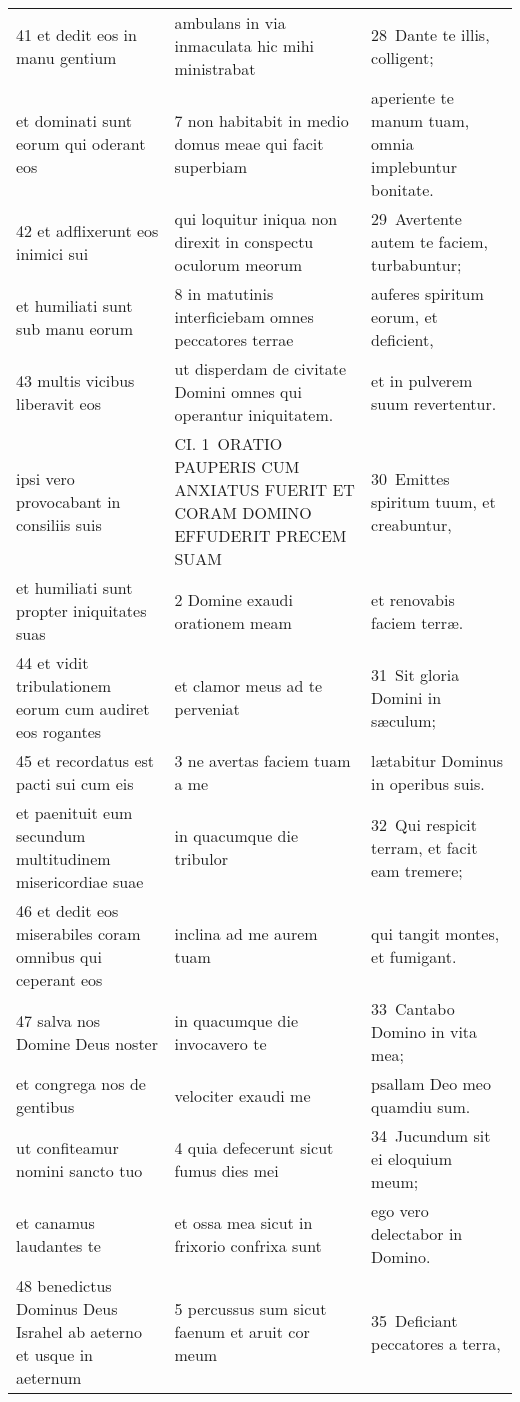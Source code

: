 \documentclass{article}
\begin{document}
\begin{longtable}{@{}p{}p{}p{}@{}}
41 et dedit eos in manu gentium	&	ambulans in via inmaculata hic mihi ministrabat	&	28 Dante te illis, colligent;	\\
et dominati sunt eorum qui oderant eos	&	7 non habitabit in medio domus meae qui facit superbiam	&	aperiente te manum tuam, omnia implebuntur bonitate.	\\
42 et adflixerunt eos inimici sui	&	qui loquitur iniqua non direxit in conspectu oculorum meorum	&	29 Avertente autem te faciem, turbabuntur;	\\
et humiliati sunt sub manu eorum	&	8 in matutinis interficiebam omnes peccatores terrae	&	auferes spiritum eorum, et deficient,	\\
43 multis vicibus liberavit eos	&	ut disperdam de civitate Domini omnes qui operantur iniquitatem.	&	et in pulverem suum revertentur.	\\
ipsi vero provocabant in consiliis suis	&	CI. 1 ORATIO PAUPERIS CUM ANXIATUS FUERIT ET CORAM DOMINO EFFUDERIT PRECEM SUAM	&	30 Emittes spiritum tuum, et creabuntur,	\\
et humiliati sunt propter iniquitates suas	&	2 Domine exaudi orationem meam	&	et renovabis faciem terræ.	\\
44 et vidit tribulationem eorum cum audiret eos rogantes	&	et clamor meus ad te perveniat	&	31 Sit gloria Domini in sæculum;	\\
45 et recordatus est pacti sui cum eis	&	3 ne avertas faciem tuam a me	&	lætabitur Dominus in operibus suis.	\\
et paenituit eum secundum multitudinem misericordiae suae	&	in quacumque die tribulor	&	32 Qui respicit terram, et facit eam tremere;	\\
46 et dedit eos miserabiles coram omnibus qui ceperant eos	&	inclina ad me aurem tuam	&	qui tangit montes, et fumigant.	\\
47 salva nos Domine Deus noster	&	in quacumque die invocavero te	&	33 Cantabo Domino in vita mea;	\\
et congrega nos de gentibus	&	velociter exaudi me	&	psallam Deo meo quamdiu sum.	\\
ut confiteamur nomini sancto tuo	&	4 quia defecerunt sicut fumus dies mei	&	34 Jucundum sit ei eloquium meum;	\\
et canamus laudantes te	&	et ossa mea sicut in frixorio confrixa sunt	&	ego vero delectabor in Domino.	\\
48 benedictus Dominus Deus Israhel ab aeterno et usque in aeternum	&	5 percussus sum sicut faenum et aruit cor meum	&	35 Deficiant peccatores a terra,	\\

\end{longtable}
\end{document}
